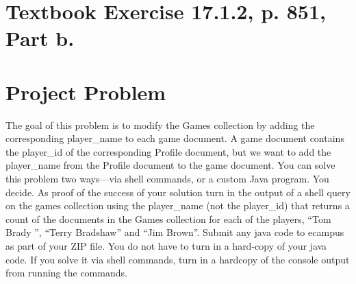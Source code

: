 \documentclass [letterpaper,12pt] {article}
\begin{document}
\section{Textbook Exercise 17.1.2, p. 851, Part b.}

\section{Project Problem}
    The goal of this problem is to modify the Games collection by adding
    the corresponding player\_name to each game document. A game document
    contains the player\_id of the corresponding Profile document, but we
    want to add the player\_name from the Profile document to the game
    document. You can solve this problem two ways—via shell commands, or 
    a custom Java program. You decide. As proof of the success of your 
    solution turn in the output of a shell query on the games collection 
    using the player\_name (not the player\_id) that returns a count of the 
    documents in the Games collection for each of the players, “Tom Brady ”, 
    “Terry Bradshaw” and “Jim Brown”. Submit any java code to ecampus as 
    part of your ZIP file. You do not have to turn in a hard-copy of your 
    java code. If you solve it via shell commands, turn in a hardcopy of 
    the console output from running the commands.
\end{document}
